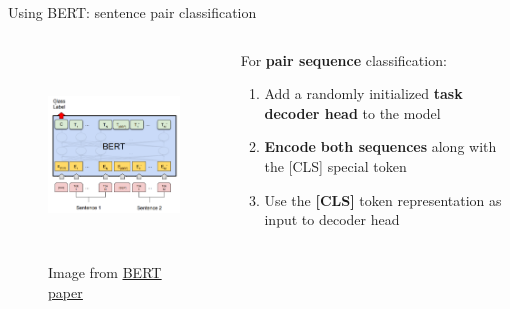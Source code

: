 \documentclass[12pt,aspectratio=169,handout]{beamer}
\begin{document}
\begin{frame}{Using BERT: sentence pair classification}
	\begin{columns}[T] %
		\begin{column}{.48\textwidth}
	\begin{figure}[h]
		\includegraphics[height=5.5cm]{bert-pair-classification}
		\caption*{Image from \href{https://arxiv.org/pdf/1810.04805.pdf}{\underline{BERT paper}}}
	\end{figure}
\end{column}

\begin{column}{.48\textwidth}
	For \textbf{pair sequence} classification:
	\begin{enumerate}
		\item Add a randomly initialized \textbf{task decoder head} to the model
		\pause
		\item \textbf{Encode} \textbf{both sequences} along with the [CLS] special token
		\pause
		\item Use the \textbf{[CLS]} token representation as input to decoder head
	\end{enumerate}
\end{column}

\end{columns}
\end{frame}
\end{document}
